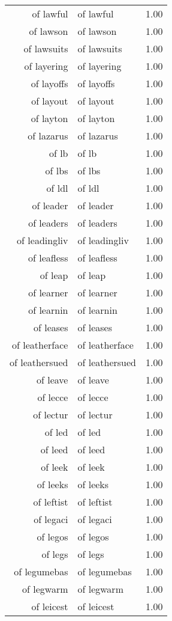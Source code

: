 \begin{table}[ht]
\begin{tabular}{rlr}
  of lawful & of lawful & 1.00 \\ 
  of lawson & of lawson & 1.00 \\ 
  of lawsuits & of lawsuits & 1.00 \\ 
  of layering & of layering & 1.00 \\ 
  of layoffs & of layoffs & 1.00 \\ 
  of layout & of layout & 1.00 \\ 
  of layton & of layton & 1.00 \\ 
  of lazarus & of lazarus & 1.00 \\ 
  of lb & of lb & 1.00 \\ 
  of lbs & of lbs & 1.00 \\ 
  of ldl & of ldl & 1.00 \\ 
  of leader & of leader & 1.00 \\ 
  of leaders & of leaders & 1.00 \\ 
  of leadingliv & of leadingliv & 1.00 \\ 
  of leafless & of leafless & 1.00 \\ 
  of leap & of leap & 1.00 \\ 
  of learner & of learner & 1.00 \\ 
  of learnin & of learnin & 1.00 \\ 
  of leases & of leases & 1.00 \\ 
  of leatherface & of leatherface & 1.00 \\ 
  of leathersued & of leathersued & 1.00 \\ 
  of leave & of leave & 1.00 \\ 
  of lecce & of lecce & 1.00 \\ 
  of lectur & of lectur & 1.00 \\ 
  of led & of led & 1.00 \\ 
  of leed & of leed & 1.00 \\ 
  of leek & of leek & 1.00 \\ 
  of leeks & of leeks & 1.00 \\ 
  of leftist & of leftist & 1.00 \\ 
  of legaci & of legaci & 1.00 \\ 
  of legos & of legos & 1.00 \\ 
  of legs & of legs & 1.00 \\ 
  of legumebas & of legumebas & 1.00 \\ 
  of legwarm & of legwarm & 1.00 \\ 
  of leicest & of leicest & 1.00 \\ 

\end{tabular}
\end{table}
